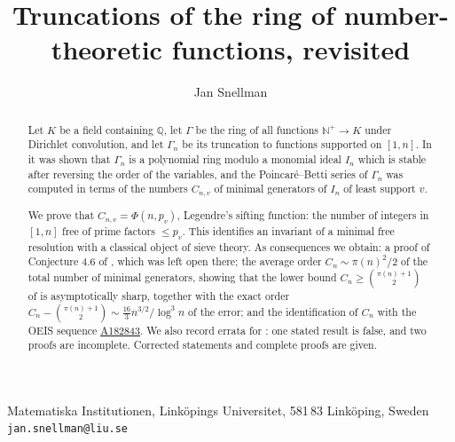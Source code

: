 \documentclass[a4paper,11pt,oneside,reqno]{amsart}
\theoremstyle{definition}
\theoremstyle{remark}
\theoremstyle{plain}
\newcommand{\NN}{\mathbb{N}}
\newcommand{\QQ}{\mathbb{Q}}
\newcommand{\Gam}{\Gamma}
\newcommand{\seqnum}[1]{\href{https://oeis.org/#1}{\underline{#1}}}
\begin{document}
\title[Truncations revisited]{Truncations of the ring of number-theoretic
  functions, revisited}
\author{Jan Snellman }
\address{Matematiska Institutionen, Linköpings Universitet, 581 83 Linköping, Sweden}
\makeatletter
\let\addresses\@empty
\makeatother
\maketitle

\begin{center}
  \small
  Matematiska Institutionen, Linköpings Universitet, 581\,83 Linköping, Sweden\\
  \texttt{jan.snellman@liu.se}
\end{center}

\begin{abstract}
  Let \(K\) be a field containing \(\QQ\), let \(\Gam\) be the ring of all
  functions \(\NN^+\to K\) under Dirichlet convolution, and let \(\Gam_n\) be
  its truncation to functions supported on \([1,n]\). In \cite{Snellman2000} it was shown that \(\Gam_n\) is a
  polynomial ring modulo a monomial ideal \(I_n\) which is stable after
  reversing the order of the variables, and the Poincaré--Betti series of
  \(\Gam_n\) was computed in terms of the numbers \(C_{n,v}\) of minimal
  generators of \(I_n\) of least support \(v\).

  We prove that \(C_{n,v} = \Phi(n,p_v)\), Legendre's sifting function: the
  number of integers in \([1,n]\) free of prime factors \(\le p_v\). This
  identifies an invariant of a minimal free resolution with a classical object
  of sieve theory. As consequences we obtain: a proof of Conjecture 4.6 of
  \cite{Snellman2000}, which was left open there; the average order
  \(C_n \sim \pi(n)^2/2\) of the total number of minimal generators, showing that
  the lower bound \(C_n \ge \binom{\pi(n)+1}{2}\) of \cite{Snellman2000} is
  asymptotically sharp, together with the exact order
  \(C_n-\binom{\pi(n)+1}{2} \sim \tfrac{16}{3}n^{3/2}/\log^{3}n\) of the error;
  and the identification of \(C_n\) with the OEIS sequence \seqnum{A182843}. We also record errata for \cite{Snellman2000}: one
  stated result is false, and two proofs are incomplete. Corrected statements
  and complete proofs are given.
\end{abstract}
\end{document}
